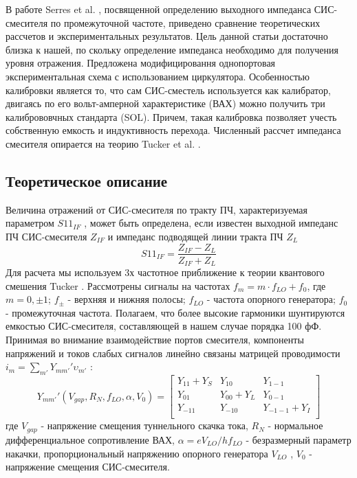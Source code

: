 \documentclass[a4paper]{article}
\begin{document}
В работе Serres et al. \cite{Serres}, посвященной определению выходного импеданса СИС-смесителя по промежуточной частоте, приведено сравнение теоретических 
рассчетов и экспериментальных результатов. Цель данной статьи достаточно близка к нашей, по скольку определение импеданса необходимо для получения уровня отражения.
Предложена модифицировання однопортовая экспериментальная схема с использованием циркулятора.
Особенностью калибровки является то, что сам СИС-сместель используется как калибратор, двигаясь по его вольт-амперной характеристике (ВАХ) можно получить три калибрововчных стандарта (SOL).
Причем, такая калибровка позволяет учесть собственную емкость и индуктивность перехода.
Численный рассчет импеданса смесителя опирается на теорию Tucker et al. \cite{Tucker}.
\par 

\subsection{Теоретическое описание}

Величина отражений от СИС-смесителя по тракту ПЧ, характеризуемая параметром $S11_{IF}$  \cite{Kooi}, может быть определена, если известен выходной импеданс ПЧ СИС-смесителя $Z_{IF}$  и импеданс подводящей линии тракта ПЧ $Z_L$
\begin{equation}
    S11_{IF} = \frac{Z_{IF} - Z_L}{Z_{IF} + Z_L}
    \label{s11}
\end{equation}
Для расчета  мы используем 3х частотное приближение к теории квантового смешения Tucker \cite{Tucker}. Рассмотрены сигналы на частотах 
$f_m = m \cdot f_{LO} + f_0$, 
где $m = 0, \pm 1$; $f_{\pm}$  - верхняя и нижняя полосы; $f_{LO}$ - частота опорного генератора; $f_0$ - промежуточная частота. Полагаем, что более высокие гармоники шунтируются емкостью СИС-смесителя, составляющей в нашем случае порядка 100 фФ.
Принимая во внимание взаимодействие портов смесителя, компоненты напряжений и токов слабых сигналов линейно связаны матрицей проводимости $i_m = \sum_{m'} Y_{mm'}' \upsilon_{m'} $ :
\begin{equation}
    Y_{mm'}' (V_{gap}, R_N, f_{LO}, \alpha, V_0) = 
    \begin{bmatrix}
        Y_{11} + Y_{S} & Y_{10} & Y_{1-1}  \\
        Y_{01} & Y_{00} + Y_L & Y_{0-1}   \\
        Y_{-11} & Y_{-10} & Y_{-1-1}+Y_I  \\
    \end{bmatrix}
    \label{Y_mm}
\end{equation}
где $V_{gap}$ - напряжение смещения туннельного скачка тока, $R_N$ - нормальное дифференциальное сопротивление ВАХ, $\alpha = e V_{LO} / h f_{LO}$ - безразмерный параметр накачки, 
пропорциональный напряжению опорного генератора $V_{LO}$ , $V_0$ - напряжение смещения СИС-смесителя.
\par
\end{document}

